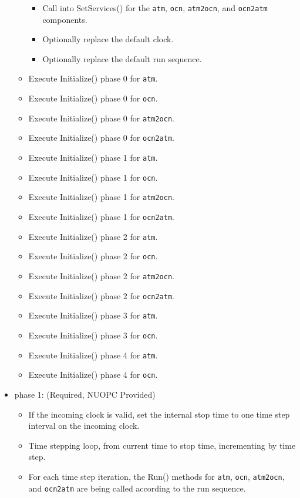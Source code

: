 \begin{itemize}
\begin{itemize}
  \begin{itemize}
    \item Call into SetServices() for the {\tt atm}, {\tt ocn}, {\tt atm2ocn}, and {\tt ocn2atm} components.
    \item Optionally replace the default clock. 
    \item Optionally replace the default run sequence.
  \end{itemize}
  \item Execute Initialize() phase 0 for {\tt atm}.
  \item Execute Initialize() phase 0 for {\tt ocn}.
  \item Execute Initialize() phase 0 for {\tt atm2ocn}.
  \item Execute Initialize() phase 0 for {\tt ocn2atm}.
  \item Execute Initialize() phase 1 for {\tt atm}.
  \item Execute Initialize() phase 1 for {\tt ocn}.
  \item Execute Initialize() phase 1 for {\tt atm2ocn}.
  \item Execute Initialize() phase 1 for {\tt ocn2atm}.
  \item Execute Initialize() phase 2 for {\tt atm}.
  \item Execute Initialize() phase 2 for {\tt ocn}.
  \item Execute Initialize() phase 2 for {\tt atm2ocn}.
  \item Execute Initialize() phase 2 for {\tt ocn2atm}.
  \item Execute Initialize() phase 3 for {\tt atm}.
  \item Execute Initialize() phase 3 for {\tt ocn}.
  \item Execute Initialize() phase 4 for {\tt atm}.
  \item Execute Initialize() phase 4 for {\tt ocn}.
  \end{itemize}  
\end{itemize}

\begin{itemize}
\item phase 1: ({\sc Required, NUOPC Provided})
  \begin{itemize}
  \item If the incoming clock is valid, set the internal stop time to one time step interval on the incoming clock.
  \item Time stepping loop, from current time to stop time, incrementing by time step.
  \item For each time step iteration, the Run() methods for {\tt atm}, {\tt ocn}, {\tt atm2ocn}, and {\tt ocn2atm} are being called according to the run sequence.
  \end{itemize}    
\end{itemize}

